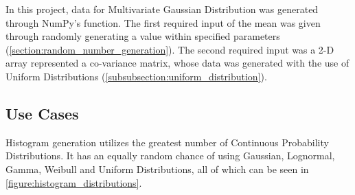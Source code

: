 In this project, data for Multivariate Gaussian Distribution was generated through NumPy's  function. The first required input of the mean was given through randomly generating a value within specified parameters (\autoref{section:random_number_generation}). The second required input was a 2-D array represented a co-variance matrix, whose data was generated with the use of Uniform Distributions (\autoref{subsubsection:uniform_distribution}).

\subsection{Use Cases}
Histogram generation utilizes the greatest number of Continuous Probability Distributions. It has an equally random chance of using Gaussian, Lognormal, Gamma, Weibull and Uniform Distributions, all of which can be seen in \autoref{figure:histogram_distributions}.

\hfill

